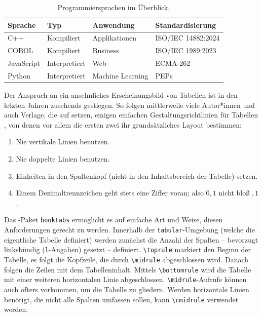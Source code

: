 \begin{program}
	\caption{\latex\ Quelltext zu Tab.~\ref{tab:programming-languages}.
	Die Erzeugung des dargestellten Listings selbst ist in Abschn.\
	\ref{sec:programmtexte} beschrieben.}
	\label{prog:programming-languages-source}
%
\begin{LaTeXCode}[numbers=none]
\begin{table}
	\caption{Programmiersprachen im Überblick.}
	\label{tab:programming-languages}
	\centering
	\setlength{\tabcolsep}{10pt} %
	\renewcommand{\arraystretch}{1.25} %
	\begin{tabular}{@{}llll@{}}
		\toprule
		Sprache    & Typ           & Anwendung        & Standardisierung   \\
		\midrule
		C++        & Kompiliert    & Applikationen    & ISO/IEC 14882:2024 \\
		COBOL      & Kompiliert    & Business         & ISO/IEC 1989:2023  \\
		JavaScript & Interpretiert & Web              & ECMA-262           \\
		Python     & Interpretiert & Machine Learning & PEPs               \\
		\bottomrule
	\end{tabular}
\end{table}
\end{LaTeXCode}
%
\end{program}

Der Anspruch an ein ansehnliches Erscheinungsbild von Tabellen ist in den
letzten Jahren zusehends gestiegen. So folgen mittlerweile viele Autor*innen
und auch Verlage, die auf \latex setzen, einigen einfachen
Gestaltungsrichtlinien für Tabellen \cite{Fear2020}, von denen vor allem die
ersten zwei ihr grundsätzliches Layout bestimmen:
%
\begin{enumerate}
	\item Nie vertikale Linien benutzen.
	\item Nie doppelte Linien benutzen.
	\item Einheiten in den Spaltenkopf (nicht in den Inhaltsbereich der
	Tabelle) setzen.
	\item Einem Dezimaltrennzeichen geht stets eine Ziffer voran; also $0{,}1$
	nicht bloß ${,}1$.
\end{enumerate}
%
Das \latex-Paket \texttt{booktabs} ermöglicht es auf einfache Art und Weise,
diesen Anforderungen gerecht zu werden. Innerhalb der
\texttt{tabular}-Umgebung (welche die eigentliche Tabelle definiert) werden
zunächst die Anzahl der Spalten -- bevorzugt linksbündig (\texttt{l}-Angaben)
gesetzt -- definiert. \verb|\toprule| markiert den Beginn der Tabelle, es
folgt die Kopfzeile, die durch \verb|\midrule| abgeschlossen wird. Danach
folgen die Zeilen mit dem Tabelleninhalt. Mittels \verb|\bottomrule| wird die
Tabelle mit einer weiteren horizontalen Linie abgeschlossen.
\verb|\midrule|-Aufrufe können auch öfters vorkommen, um die Tabelle zu
gliedern. Werden horizontale Linien benötigt, die nicht alle Spalten umfassen
sollen, kann \verb|\cmidrule| verwendet werden.

